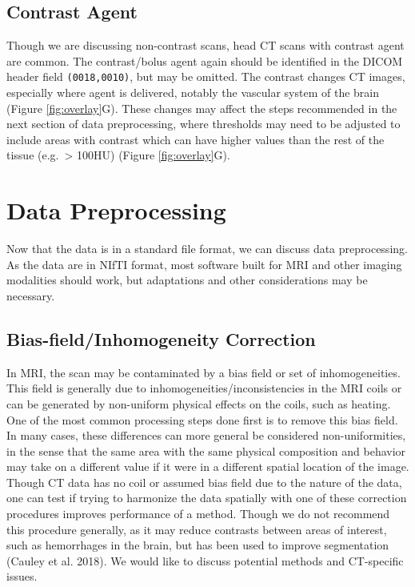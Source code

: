 \documentclass[]{elsarticle} %
\begin{document}
\hypertarget{contrast-agent}{%
\subsection{Contrast Agent}\label{contrast-agent}}

Though we are discussing non-contrast scans, head CT scans with contrast agent are common. The contrast/bolus agent again should be identified in the DICOM header field \texttt{(0018,0010)}, but may be omitted. The contrast changes CT images, especially where agent is delivered, notably the vascular system of the brain (Figure \ref{fig:overlay}G). These changes may affect the steps recommended in the next section of data preprocessing, where thresholds may need to be adjusted to include areas with contrast which can have higher values than the rest of the tissue (e.g.~\textgreater{} 100HU) (Figure \ref{fig:overlay}G).

\hypertarget{data-preprocessing}{%
\section{Data Preprocessing}\label{data-preprocessing}}

Now that the data is in a standard file format, we can discuss data preprocessing. As the data are in NIfTI format, most software built for MRI and other imaging modalities should work, but adaptations and other considerations may be necessary.

\hypertarget{bias-fieldinhomogeneity-correction}{%
\subsection{Bias-field/Inhomogeneity Correction}\label{bias-fieldinhomogeneity-correction}}

In MRI, the scan may be contaminated by a bias field or set of inhomogeneities. This field is generally due to inhomogeneities/inconsistencies in the MRI coils or can be generated by non-uniform physical effects on the coils, such as heating. One of the most common processing steps done first is to remove this bias field. In many cases, these differences can more general be considered non-uniformities, in the sense that the same area with the same physical composition and behavior may take on a different value if it were in a different spatial location of the image. Though CT data has no coil or assumed bias field due to the nature of the data, one can test if trying to harmonize the data spatially with one of these correction procedures improves performance of a method. Though we do not recommend this procedure generally, as it may reduce contrasts between areas of interest, such as hemorrhages in the brain, but has been used to improve segmentation (Cauley et al. 2018). We would like to discuss potential methods and CT-specific issues.
\end{document}
